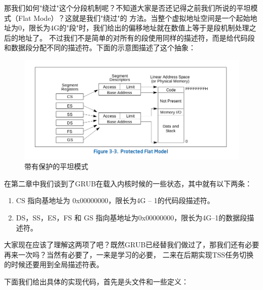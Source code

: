 \par 那我们如何"绕过"这个分段机制呢？不知道大家是否还记得之前我们所说的平坦模式（Flat Mode）？这就是我们"绕过"的\allowbreak
方法。当整个虚拟地址空间是一个起始地址为0，限长为4G的"段"时，我们给出的偏移地址就在数值上等于是段机制处理之后的地址了。
不过我们不是简单的对所有的段使用同样的描述符，而是给代码段和数据段分配不同的描述符。下面的示意图描述了这个抽象：

\begin{figure}[ht]
      \centering
      \includegraphics[scale=0.5]{picture/chapt6/protected_flat_mode.png}
      \caption{带有保护的平坦模式}
\end{figure}

\par 在第二章中我们谈到了GRUB在载入内核时候的一些状态，其中就有以下两条：

\begin{mdframed}
	\begin{enumerate}
		\item CS 指向基地址为 0x00000000，限长为4G – 1的代码段描述符。
		\item DS，SS，ES，FS 和 GS 指向基地址为0x00000000，限长为4G–1的数据段描述符。
	\end{enumerate}
\end{mdframed}

\par 大家现在应该了理解这两项了吧？既然GRUB已经替我们做过了，那我们还有必要再来一次吗？当然有必要了，一来是学习的必要，\allowbreak
二来在后期实现TSS任务切换的时候还要用到全局描述符表。

\par 下面我们给出具体的实现代码，首先是头文件和一些定义：

